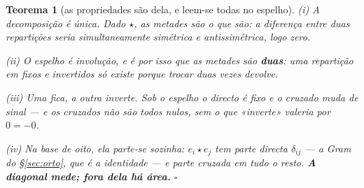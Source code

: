 \documentclass[11pt,a4paper]{article}
\newtheorem{teorema}{Teorema}
\begin{document}
\begin{teorema}[as propriedades são dela, e leem-se todas no espelho]\label{thm:operacao}
\emph{(i) A decomposição é única.} Dado $\star$, as metades são o que são: a diferença
entre duas repartições seria simultaneamente simétrica e antissimétrica, logo \emph{zero}.

\emph{(ii) O espelho é involução}, e é por isso que as metades são \textbf{duas}: uma
repartição em fixos e invertidos só existe porque trocar duas vezes devolve.

\emph{(iii) Uma fica, a outra inverte.} Sob o espelho o directo é fixo e o cruzado muda de
sinal --- e os cruzados não são todos nulos, sem o que «inverte» valeria por $0=-0$.

\emph{(iv) Na base de oito, ela parte-se sozinha}: $e_i\star e_j$ tem parte directa
$\delta_{ij}$ --- a Gram do \S\ref{sec:orto}, que é a identidade --- e parte cruzada em
tudo o resto. \textbf{A diagonal mede; fora dela há área.} $\square$
\end{teorema}
\end{document}
